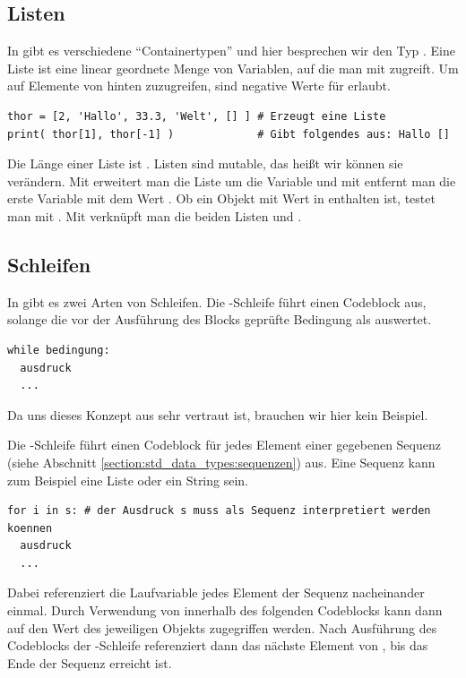 \subsection{Listen}
\label{section:crashkurs:listen}
In \Python gibt es verschiedene ``Containertypen'' und hier besprechen wir den Typ .
Eine Liste  ist eine linear geordnete Menge von Variablen, auf die man mit  zugreift.
Um auf Elemente von hinten zuzugreifen, sind negative Werte für  erlaubt.
\begin{lstlisting}
thor = [2, 'Hallo', 33.3, 'Welt', [] ] # Erzeugt eine Liste
print( thor[1], thor[-1] )             # Gibt folgendes aus: Hallo []
\end{lstlisting}
Die Länge einer Liste ist .
Listen sind mutable, das heißt wir können sie verändern.
Mit  erweitert man die Liste  um die Variable  und mit  entfernt man die erste Variable mit dem Wert .
Ob ein Objekt mit Wert  in  enthalten ist, testet man mit .
Mit  verknüpft man die beiden Listen  und .


\subsection{Schleifen}
\label{section:crashkurs:schleifen}
In \Python gibt es zwei Arten von Schleifen.
Die -Schleife führt einen Codeblock aus, solange die vor der Ausführung des Blocks geprüfte Bedingung als  auswertet.
\begin{lstlisting}
while bedingung:
  ausdruck
  ...
\end{lstlisting}
Da uns dieses Konzept aus \CC sehr vertraut ist, brauchen wir hier kein Beispiel.

Die -Schleife führt einen Codeblock für jedes Element einer gegebenen Sequenz (siehe Abschnitt \ref{section:std_data_types:sequenzen}) aus.
Eine Sequenz kann zum Beispiel eine Liste oder ein String sein.
\begin{lstlisting}
for i in s: # der Ausdruck s muss als Sequenz interpretiert werden koennen
  ausdruck
  ...
\end{lstlisting}
Dabei referenziert die Laufvariable  jedes Element der Sequenz  nacheinander einmal. Durch Verwendung von  innerhalb 
des folgenden Codeblocks kann 
dann auf den Wert des jeweiligen Objekts zugegriffen werden. Nach Ausführung des Codeblocks der -Schleife referenziert 
 dann das nächste Element von , bis das Ende der Sequenz erreicht ist. 

